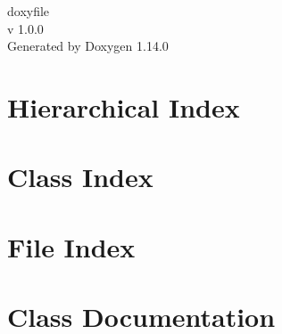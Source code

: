 \documentclass[twoside]{book}
\newcommand{\+}{\discretionary{\mbox{\scriptsize$\hookleftarrow$}}{}{}}
\newcommand{\clearemptydoublepage}{%
    \newpage{\pagestyle{empty}\cleardoublepage}%
  }
\begin{document}
  \raggedbottom
    \hypersetup{pageanchor=false,
                bookmarksnumbered=true,
                pdfencoding=unicode
               }
  \begin{titlepage}
  \vspace*{7cm}
  \begin{center}%
  {\Large doxyfile}\\
  [1ex]\large v 1.\+0.\+0 \\
  \vspace*{1cm}
  {\large Generated by Doxygen 1.14.0}\\
  \end{center}
  \end{titlepage}
  \clearemptydoublepage
  \tableofcontents
  \clearemptydoublepage
  \hypersetup{pageanchor=true}
\chapter{Hierarchical Index}

\chapter{Class Index}

\chapter{File Index}

\chapter{Class Documentation}




























\end{document}

